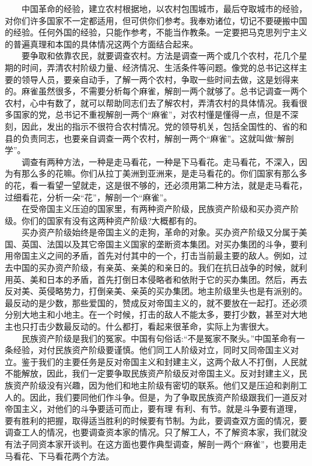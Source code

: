 \documentclass[cn,11pt,chinese]{elegantbook}
\begin{document}
　　中国革命的经验，建立农村根据地，以农村包围城市，最后夺取城市的经验，对你们许多国家不一定都适用，但可供你们参考。我奉劝诸位，切记不要硬搬中国的经验。任何外国的经验，只能作参考，不能当作教条。一定要把马克思列宁主义的普遍真理和本国的具体情况这两个方面结合起来。\\
　　要争取和依靠农民，就要调查农村。方法是调查一两个或几个农村，花几个星期的时间，弄清农村阶级力量、经济情况、生活条件等问题。像党的总书记这样主要的领导人员，要亲自动手，了解一两个农村，争取一些时间去做，这是划得来的。麻雀虽然很多，不需要分析每个麻雀，解剖一两个就够了。总书记调查一两个农村，心中有数了，就可以帮助同志们去了解农村，弄清农村的具体情况。我看很多国家的党，总书记不重视解剖一两个“麻雀”，对农村懂是懂得一点，但是不深刻，因此，发出的指示不很符合农村情况。党的领导机关，包括全国性的、省的和县的负责同志，也要亲自调查一两个农村，解剖一两个“麻雀”。这就叫做“解剖学”。\\
　　调查有两种方法，一种是走马看花，一种是下马看花。走马看花，不深入，因为有那么多的花嘛。你们从拉丁美洲到亚洲来，是走马看花的。你们国家有那么多的花，看一看望一望就走，这是很不够的，还必须用第二种方法，就是走马看花，过细看花，分析一朵“花”，解剖一个“麻雀”。\\
　　在受帝国主义压迫的国家里，有两种资产阶级，民族资产阶级和买办资产阶级。你们的国家有没有这两种资产阶级?大概都有的。\\
　　买办资产阶级始终是帝国主义的走狗，革命的对象。买办资产阶级又分属于美国、英国、法国以及其它帝国主义国家的垄断资本集团。对买办集团的斗争，要利用帝国主义之间的矛盾，首先对付其中的一个，打击当前最主要的敌人。例如，过去中国的买办资产阶级，有亲英、亲美的和亲日的。我们在抗日战争的时候，就利用英、美和日本的矛盾，首先打倒日本侵略者和依附于它的买办集团。然后，再去反对美、英侵略势力，打倒亲美、亲英的买办集团。地主阶级里头也是有派别的。最反动的是少数，那些爱国的，赞成反对帝国主义的，就不要放在一起打。还必须分别大地主和小地主。在一个时候，打击的敌人不能太多，要打少数，甚至对大地主也只打击少数最反动的。什么都打，看起来很革命，实际上为害很大。\\
　　民族资产阶级是我们的冤家。中国有句俗话:“不是冤家不聚头。”中国革命有一条经验，对付民族资产阶级要谨慎。他们同工人阶级对立，同时又同帝国主义对立。鉴于我们的主要任务是反对帝国主义和封建主义，这两个敌人不打倒，人民就不能解放，因此，我们一定要争取民族资产阶级反对帝国主义。反对封建主义，民族资产阶级没有兴趣，因为他们和地主阶级有密切的联系。他们又是压迫和剥削工人的。因此，我们要同他们作斗争。但是，为了争取民族资产阶级跟我们一道反对帝国主义，对他们的斗争要适可而止，要有理 有利、有节。就是斗争要有道理，要有胜利的把握，取得适当胜利的时候要有节制。为此，要调查双方面的情况，要调查工人的情况，也要调查资本家的情况。只了解工人，不了解资本家，我们就没有法子同资本家开谈判。在这方面也要作典型调查，解剖一两个“麻雀”，也要用走马看花、下马看花两个方法。\\
\end{document}
